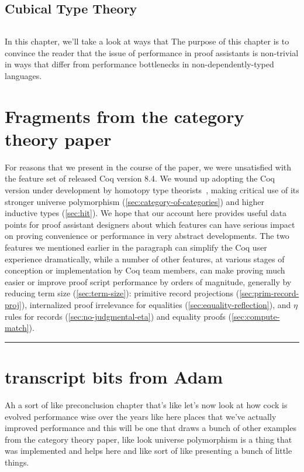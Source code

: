 \subsection{Cubical Type Theory}\label{sec:fixes:theory:cubical}\label{sec:cubical}
$\left.\right.$


In this chapter, we'll take a look at ways that
The purpose of this chapter is to convince the reader that the issue of performance in proof assistants is non-trivial in ways that differ from performance bottlenecks in non-dependently-typed languages.



\begin{subappendices}
    \section{Fragments from the category theory paper}
    For reasons that we present in the course of the paper, we were unsatisfied with the feature set of released Coq version 8.4.  We wound up adopting the Coq version under development by homotopy type theorists~\cite{HoTT/coq}, making critical use of its stronger universe polymorphism (\autoref{sec:category-of-categories}) and higher inductive types (\autoref{sec:hit}).  We hope that our account here provides useful data points for proof assistant designers about which features can have serious impact on proving convenience or performance in very abstract developments.  The two features we mentioned earlier in the paragraph can simplify the Coq user experience dramatically, while a number of other features, at various stages of conception or implementation by Coq team members, can make proving much easier or improve proof script performance by orders of magnitude, generally by reducing term size (\autoref{sec:term-size}): primitive record projections (\autoref{sec:prim-record-proj}), internalized proof irrelevance for equalities (\autoref{sec:equality-reflection}), and $\eta$ rules for records (\autoref{sec:no-judgmental-eta}) and equality proofs (\autoref{sec:compute-match}).

    \hrule


    \section{transcript bits from Adam}
    Ah a sort of like preconclusion chapter that's like let's now look at how cock is evolved performance wise over the years like here places that we've actually improved performance and this will be one that draws a bunch of other examples from the category theory paper, like look universe polymorphism is a thing that was implemented and helps here and like sort of like presenting a bunch of little things.

\end{subappendices}
